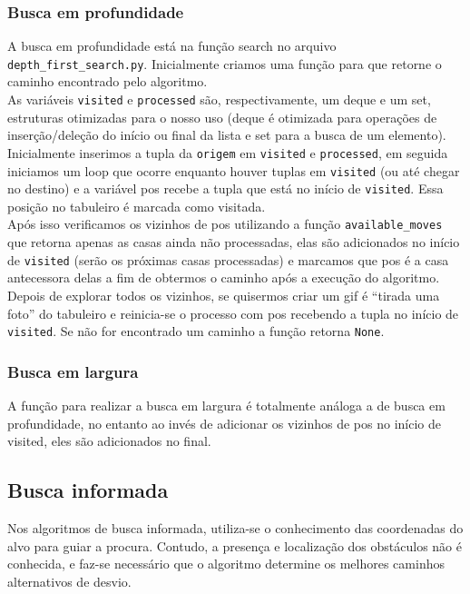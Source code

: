 \documentclass[12pt]{article}
\begin{document}
\subsubsection{Busca em profundidade}
A busca em profundidade está na função search no arquivo \verb|depth_first_search.py|. Inicialmente criamos uma função para que retorne o caminho encontrado pelo algoritmo.\\

As variáveis \verb|visited| e \verb|processed| são, respectivamente, um deque e um set, estruturas otimizadas para o nosso uso (deque é otimizada para operações de inserção/deleção do início ou final da lista e set para a busca de um elemento). Inicialmente inserimos a tupla da \verb|origem| em \verb|visited| e \verb|processed|, em seguida iniciamos um loop que ocorre enquanto houver tuplas em \verb|visited| (ou até chegar no destino) e a variável pos recebe a tupla que está no início de \verb|visited|. Essa posição no tabuleiro é marcada como visitada.\\

Após isso verificamos os vizinhos de pos utilizando a função \verb|available_moves| que retorna apenas as casas ainda não processadas, elas são adicionados no início de \verb|visited| (serão os próximas casas processadas) e marcamos que pos é a casa antecessora delas a fim de obtermos o caminho após a execução do algoritmo.\\

Depois de explorar todos os vizinhos, se quisermos criar um gif é “tirada uma foto” do tabuleiro e reinicia-se o processo com pos recebendo a tupla no início de \verb|visited|.
Se não for encontrado um caminho a função retorna \verb|None|.


\subsubsection{Busca em largura}
A função para realizar a busca em largura é totalmente análoga a de busca em profundidade, no entanto ao invés de adicionar os vizinhos de pos no início de visited, eles são adicionados no final.


\subsection{Busca informada}
Nos algoritmos de busca informada, utiliza-se o conhecimento das coordenadas do alvo para guiar a procura. Contudo, a presença e localização dos obstáculos não é conhecida, e faz-se necessário que o algoritmo determine os melhores caminhos alternativos de desvio.\\
\end{document}
